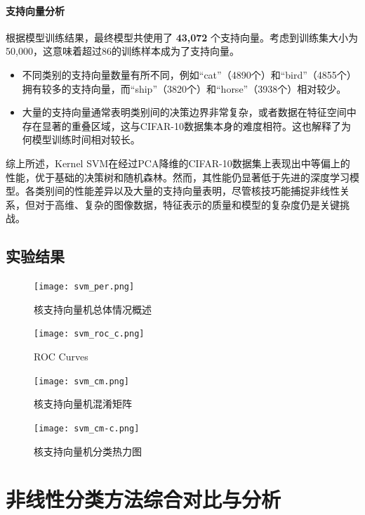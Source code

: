 \documentclass[UTF8]{report}
\theoremstyle{MyLineTheoremStyle} %
\theoremstyle{MyBlockTheoremStyle} %
\theoremstyle{MySubsubsectionStyle} %
\begin{document}
\paragraph{支持向量分析}
根据模型训练结果，最终模型共使用了 \textbf{43,072} 个支持向量。考虑到训练集大小为50,000，这意味着超过86的训练样本成为了支持向量。
\begin{itemize}
    \item 不同类别的支持向量数量有所不同，例如“cat”（4890个）和“bird”（4855个）拥有较多的支持向量，而“ship”（3820个）和“horse”（3938个）相对较少。
    \item 大量的支持向量通常表明类别间的决策边界非常复杂，或者数据在特征空间中存在显著的重叠区域，这与CIFAR-10数据集本身的难度相符。这也解释了为何模型训练时间相对较长。
\end{itemize}

综上所述，Kernel SVM在经过PCA降维的CIFAR-10数据集上表现出中等偏上的性能，优于基础的决策树和随机森林。然而，其性能仍显著低于先进的深度学习模型。各类别间的性能差异以及大量的支持向量表明，尽管核技巧能捕捉非线性关系，但对于高维、复杂的图像数据，特征表示的质量和模型的复杂度仍是关键挑战。

\subsection{实验结果}

\begin{figure}[H]
    \centering
    \texttt{[image: svm\_per.png]}
    \caption{核支持向量机总体情况概述}
    \label{fig:svm_performance}
\end{figure}

\begin{figure}[H]
    \centering
    \texttt{[image: svm\_roc\_c.png]}
    \caption{ROC Curves}
    \label{fig:svm_ROC_Curves}
\end{figure}

\begin{figure}[H]
    \centering
    \texttt{[image: svm\_cm.png]}
    \caption{核支持向量机混淆矩阵}
    \label{fig:svm_confusion_matrix}
\end{figure}

\begin{figure}[H]
    \centering
    \texttt{[image: svm\_cm-c.png]}
    \caption{核支持向量机分类热力图}
    \label{fig:svm_classification_metrics}
\end{figure}

\section{非线性分类方法综合对比与分析}
\end{document}
